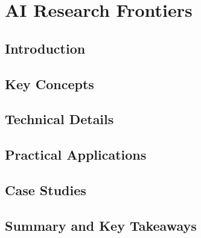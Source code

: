 ﻿%

\chapter{AI Research Frontiers}
\label{ch:chapter-23}

\section{Introduction}


\section{Key Concepts}


\section{Technical Details}


\section{Practical Applications}


\section{Case Studies}


\section{Summary and Key Takeaways}


